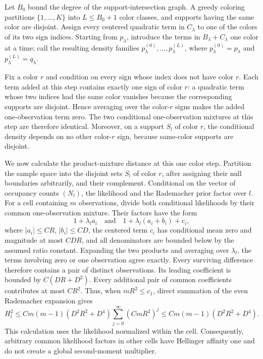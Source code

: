 Let \(B_0\) bound the degree of the support-intersection graph. A greedy coloring partitions \(\{1,\ldots,K\}\) into \(L\le B_0+1\) color classes, and supports having the same color are disjoint. Assign every centered quadratic term in \(C_\lambda\) to one of the colors of its two sign indices. Starting from \(p_\lambda\), introduce the terms in \(B_\lambda+C_\lambda\) one color at a time; call the resulting density families \(p_\lambda^{(0)},\ldots,p_\lambda^{(L)}\), where \(p_\lambda^{(0)}=p_\lambda\) and \(p_\lambda^{(L)}=q_\lambda\).

Fix a color \(r\) and condition on every sign whose index does not have color \(r\). Each term added at this step contains exactly one sign of color \(r\): a quadratic term whose two indices had the same color vanishes because the corresponding supports are disjoint. Hence averaging over the color-\(r\) signs makes the added one-observation term zero. The two conditional one-observation mixtures at this step are therefore identical. Moreover, on a support \(S_l\) of color \(r\), the conditional density depends on no other color-\(r\) sign, because same-color supports are disjoint.

We now calculate the product-mixture distance at this one color step. Partition the sample space into the disjoint sets \(S_l\) of color \(r\), after assigning their null boundaries arbitrarily, and their complement. Conditional on the vector of occupancy counts \((N_l)\), the likelihood and the Rademacher prior factor over \(l\). For a cell containing \(m\) observations, divide both conditional likelihoods by their common one-observation mixture. Their factors have the form
\[
 1+\lambda_l a_i
 \quad\text{and}\quad
 1+\lambda_l(a_i+b_i)+c_i,
\]
where \(|a_i|\le CR\), \(|b_i|\le CD\), the centered term \(c_i\) has conditional mean zero and magnitude at most \(CDR\), and all denominators are bounded below by the assumed ratio constant. Expanding the two products and averaging over \(\lambda_l\), the terms involving zero or one observation agree exactly. Every surviving difference therefore contains a pair of distinct observations. Its leading coefficient is bounded by \(C(DR+D^2)\). Every additional pair of common coefficients contributes at most \(CR^2\). Thus, when \(mR^2\le c_1\), direct summation of the even Rademacher expansion gives
\[
 H_l^2\le C m(m-1)(D^2R^2+D^4)
 \sum_{j=0}^\infty(CmR^2)^j
 \le C m(m-1)(D^2R^2+D^4).
\]
This calculation uses the likelihood normalized within the cell. Consequently, arbitrary common likelihood factors in other cells have Hellinger affinity one and do not create a global second-moment multiplier.

